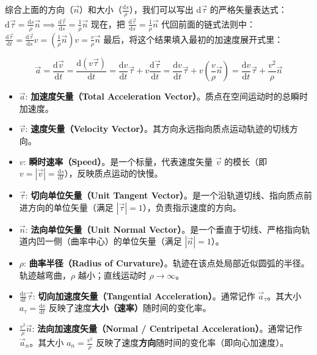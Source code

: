 综合上面的方向（$\vec{n}$）和大小（$\frac{\mathrm{d}s}{\rho}$），我们可以写出 $\mathrm{d}\vec{\tau}$ 的严格矢量表达式： \(\mathrm{d}\vec{\tau} = \frac{\mathrm{d}s}{\rho}\vec{n} \implies \frac{\mathrm{d}\vec{\tau}}{\mathrm{d}s} = \frac{1}{\rho}\vec{n}\) 
现在，把 $\frac{\mathrm{d}\vec{\tau}}{\mathrm{d}s} = \frac{1}{\rho}\vec{n}$ 代回前面的链式法则中： \(\frac{\mathrm{d}\vec{\tau}}{\mathrm{d}t} = \frac{\mathrm{d}\vec{\tau}}{\mathrm{d}s} v = \left(\frac{1}{\rho}\vec{n}\right) v = \frac{v}{\rho}\vec{n}\) 最后，将这个结果填入最初的加速度展开式里：
\begin{definition}
$$\vec{a} = \frac{\mathrm{d}\vec{v}}{\mathrm{d}t} = \frac{\mathrm{d}(v\vec{\tau})}{\mathrm{d}t} = \frac{\mathrm{d}v}{\mathrm{d}t}\vec{\tau} + v\frac{\mathrm{d}\vec{\tau}}{\mathrm{d}t} = \frac{\mathrm{d}v}{\mathrm{d}t}\vec{\tau} + v\left(\frac{v}{\rho}\vec{n}\right)= \frac{\mathrm{d}v}{\mathrm{d}t}\vec{\tau} + \frac{v^2}{\rho}\vec{n}$$
\begin{itemize}
\item $\vec{a}$: \textbf{加速度矢量（Total Acceleration Vector）}。质点在空间运动时的总瞬时加速度。
\item $\vec{v}$: \textbf{速度矢量（Velocity Vector）}。其方向永远指向质点运动轨迹的切线方向。
\item $v$: \textbf{瞬时速率（Speed）}。是一个标量，代表速度矢量 $\vec{v}$ 的模长（即 $v = |\vec{v}| = \frac{\mathrm{d}s}{\mathrm{d}t}$），反映质点运动的快慢。
\item $\vec{\tau}$: \textbf{切向单位矢量（Unit Tangent Vector）}。是一个沿轨道切线、指向质点前进方向的单位矢量（满足 $|\vec{\tau}| = 1$），负责指示速度的方向。
\item $\vec{n}$: \textbf{法向单位矢量（Unit Normal Vector）}。是一个垂直于切线、严格指向轨道内凹一侧（曲率中心）的单位矢量（满足 $|\vec{n}| = 1$）。
\item $\rho$: \textbf{曲率半径（Radius of Curvature）}。轨迹在该点处局部近似圆弧的半径。轨迹越弯曲，$\rho$ 越小；直线运动时 $\rho \to \infty$。
\item $\frac{\mathrm{d}v}{\mathrm{d}t}\vec{\tau}$: \textbf{切向加速度矢量（Tangential Acceleration）}。通常记作 $\vec{a}_\tau$。其大小 $a_\tau = \frac{\mathrm{d}v}{\mathrm{d}t}$ 反映了速度\textbf{大小（速率）}随时间的变化率。
\item $\frac{v^2}{\rho}\vec{n}$: \textbf{法向加速度矢量（Normal / Centripetal Acceleration）}。通常记作 $\vec{a}_n$。其大小 $a_n = \frac{v^2}{\rho}$ 反映了速度\textbf{方向}随时间的变化率（即向心加速度）。
\end{itemize}
\end{definition}

